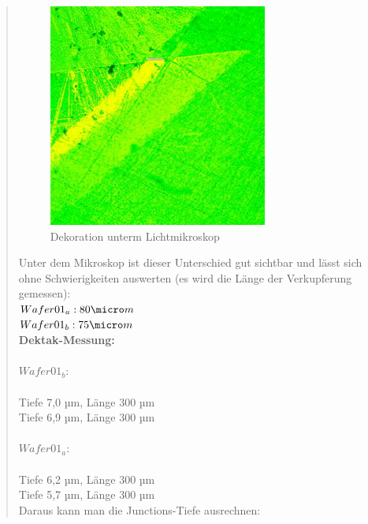 \begin{quote}
    		\vspace{2em}

    		\begin{figure}[H]
				\hspace{4.2 cm}
                  \includegraphics[scale=1, trim = 0cm 0cm 0cm 0cm,clip]
                	{./HerstellungBilder/DekorationunterdemLichtmikroskop.png}
                  \caption{Dekoration unterm Lichtmikroskop}
                \label{fig:dek}
            \end{figure}

    		\vspace{2em}


			Unter dem Mikroskop ist dieser Unterschied gut sichtbar und lässt
			sich ohne Schwierigkeiten auswerten (es wird die Länge der
			Verkupferung gemessen):\\
			$Wafer01_a: 80\micro m$\\
			$Wafer01_b: 75\micro m$\\

			\textbf{Dektak-Messung:}\\
			\\
			$Wafer01_b:$\\
			\\
			Tiefe 7,0 µm, Länge 300 µm\\
			Tiefe 6,9 µm, Länge 300 µm\\
			\\
			$Wafer01_a$:\\
			\\
			Tiefe 6,2 µm, Länge 300 µm\\
			Tiefe 5,7 µm, Länge 300 µm\\

			Daraus kann man die Junctions-Tiefe ausrechnen:

			\vspace{2em}


\end{quote}

